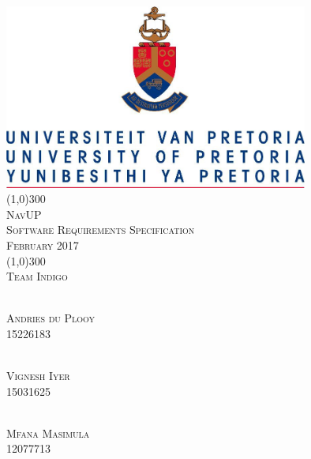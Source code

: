 \documentclass[runningheads,a4paper]{llncs}
\begin{document}
%
%
%
%
%
%
%
	\begin{titlepage}
		\begin{center}
			\includegraphics[width=10cm]{UP.jpg}  \\
			[1cm]
			\line(1,0){300} \\
			[0.3cm]
			\textsc{\Large
				NavUP\\
				Software Requirements Specification\\
			\hfill {} February 2017
			}\\
			[0.1cm]
			\line(1,0){300} \\
			[0.7cm]
			\textsc{\Large
				Team Indigo
			} \\
			
			
			
		\end{center}
		
		\begin{center}
			\begin{multicols}{2}
				\textsc{\large\\
				Andries du Plooy\\ 
					15226183\\ 
				}
				
				\textsc{\large\\
				Vignesh Iyer\\
					 15031625\\ 
				}
				
				\textsc{\large\\
		        Mfana Masimula\\
				 	12077713\\ 
				}
				

\end{multicols}
\end{center}
\end{titlepage}
\end{document}
